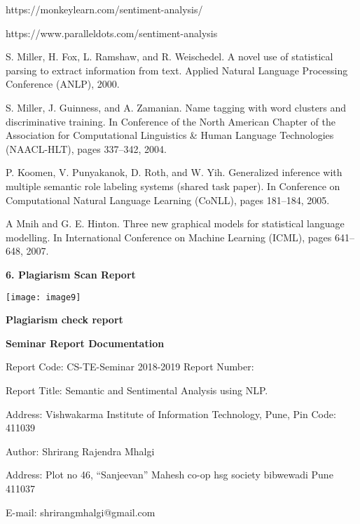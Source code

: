 \documentclass{article} %
\begin{document}
\noindent [4.] https://monkeylearn.com/sentiment-analysis/

\noindent [5.] https://www.paralleldots.com/sentiment-analysis

\noindent [6. ] S. Miller, H. Fox, L. Ramshaw, and R. Weischedel. A novel use of statistical parsing to extract information from text. Applied Natural Language Processing Conference (ANLP), 2000. 

\noindent [7.] S. Miller, J. Guinness, and A. Zamanian. Name tagging with word clusters and discriminative training. In Conference of the North American Chapter of the Association for Computational Linguistics \& Human Language Technologies (NAACL-HLT), pages 337--342, 2004. 

\noindent [8.] P. Koomen, V. Punyakanok, D. Roth, and W. Yih. Generalized inference with multiple semantic role labeling systems (shared task paper). In Conference on Computational Natural Language Learning (CoNLL), pages 181--184, 2005.

\noindent [9.] A Mnih and G. E. Hinton. Three new graphical models for statistical language modelling. In International Conference on Machine Learning (ICML), pages 641--648, 2007.\textbf{}

\noindent \textbf{}

\noindent \textbf{\eject }

\noindent \textbf{6. Plagiarism Scan Report}

\noindent \texttt{[image: image9]}

\noindent \textbf{Plagiarism check report}

\noindent \textbf{}

\noindent \textbf{\eject }

\noindent \textbf{Seminar Report Documentation}

\noindent 

\noindent Report Code: CS-TE-Seminar 2018-2019   Report Number: 

\noindent Report Title: Semantic and Sentimental Analysis using NLP.

\noindent Address: Vishwakarma Institute of Information Technology, Pune, Pin Code: 411039 

\noindent Author: Shrirang Rajendra Mhalgi

\noindent Address: Plot no 46, ``Sanjeevan'' Mahesh co-op hsg society bibwewadi Pune 411037 

\noindent E-mail: shrirangmhalgi@gmail.com
\end{document}
